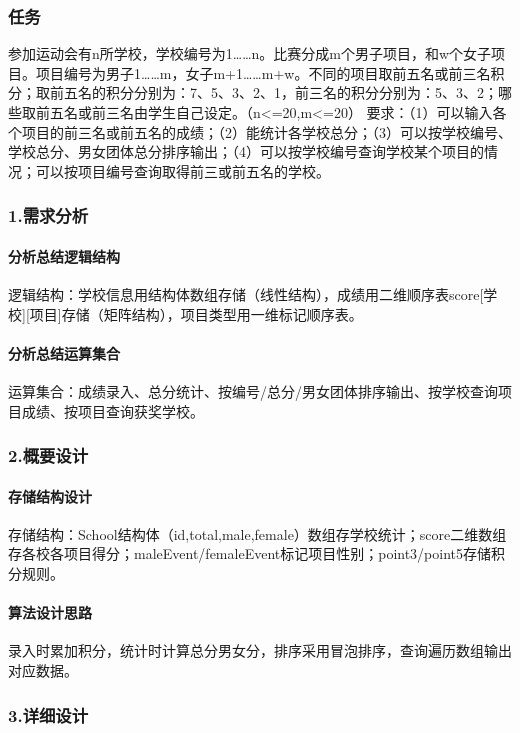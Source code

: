 \documentclass{ctexart}
\begin{document}
\subsubsection{任务}
参加运动会有n所学校，学校编号为1……n。比赛分成m个男子项目，和w个女子项目。项目编号为男子1……m，女子m+1……m+w。不同的项目取前五名或前三名积分；取前五名的积分分别为：7、5、3、2、1，前三名的积分分别为：5、3、2；哪些取前五名或前三名由学生自己设定。（n<=20,m<=20）
要求：（1）可以输入各个项目的前三名或前五名的成绩；（2）能统计各学校总分；（3）可以按学校编号、学校总分、男女团体总分排序输出；（4）可以按学校编号查询学校某个项目的情况；可以按项目编号查询取得前三或前五名的学校。

\subsubsection{1.需求分析}
\paragraph{分析总结逻辑结构}
逻辑结构：学校信息用结构体数组存储（线性结构），成绩用二维顺序表score[学校][项目]存储（矩阵结构），项目类型用一维标记顺序表。
\paragraph{分析总结运算集合}
运算集合：成绩录入、总分统计、按编号/总分/男女团体排序输出、按学校查询项目成绩、按项目查询获奖学校。

\subsubsection{2.概要设计}
\paragraph{存储结构设计}
存储结构：School结构体（id,total,male,female）数组存学校统计；score二维数组存各校各项目得分；maleEvent/femaleEvent标记项目性别；point3/point5存储积分规则。
\paragraph{算法设计思路}
录入时累加积分，统计时计算总分男女分，排序采用冒泡排序，查询遍历数组输出对应数据。

\subsubsection{3.详细设计}
\end{document}
